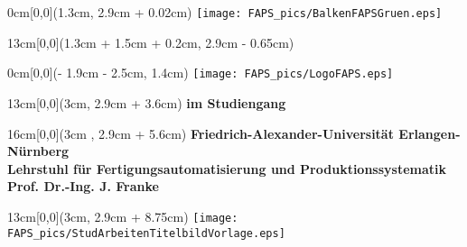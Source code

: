 \newpage
\thispagestyle{empty}



\begin{textblock*}{0cm}[0,0](1.3cm, 2.9cm + 0.02cm)
	\texttt{[image: FAPS\_pics/BalkenFAPSGruen.eps]}
\end{textblock*}

\begin{textblock*}{13cm}[0,0](1.3cm + 1.5cm + 0.2cm, 2.9cm - 0.65cm)
\singlespacing
\Large \bfseries \TITEL
\end{textblock*}

\begin{textblock*}{0cm}[0,0](\paperwidth - 1.9cm - 2.5cm, 1.4cm)
	\texttt{[image: FAPS\_pics/LogoFAPS.eps]}
\end{textblock*}

\begin{textblock*}{13cm}[0,0](3cm, 2.9cm + 3.6cm)
	\singlespacing
	\bfseries \ARBEIT\;im Studiengang \STUDIENGANG
\end{textblock*}

\begin{textblock*}{16cm}[0,0](3cm , 2.9cm + 5.6cm)
	\singlespacing
	\bfseries
	Friedrich-Alexander-Universität Erlangen-Nürnberg\\
	Lehrstuhl für Fertigungsautomatisierung und Produktionssystematik\\
	Prof. Dr.-Ing. J. Franke
\end{textblock*}

\begin{textblock*}{13cm}[0,0](3cm, 2.9cm + 8.75cm)
	\texttt{[image: FAPS\_pics/StudArbeitenTitelbildVorlage.eps]}
\end{textblock*}

\begin{comment}


\begin{textblock*}{13cm}[0,0](3cm, 2.9cm + 9cm + 9.2cm)
\singlespacing
\begin{table}[h!]
	\begin{tabular}{p{3.5cm}p{7cm}R{4.2cm}}
		Bearbeiter: 	&	\NAME 				& Matrikelnr.: \MATRNR\\
		& & \\
		Betreuer:		&	Prof. Dr.-Ing. J. Franke	& \\ 
					&	Dipl.-Ing. M. Landgraf	& \\
		& & \\
		Abgabetermin: 	&	\ENDE 				& \\
		Bearbeitungszeit:	&	\BEARBEITUNGSZEIT\; Monate &
	\end{tabular}
\end{table}
\end{textblock*}
\end{comment}

\mbox{ }

\newpage
\thispagestyle{empty}



